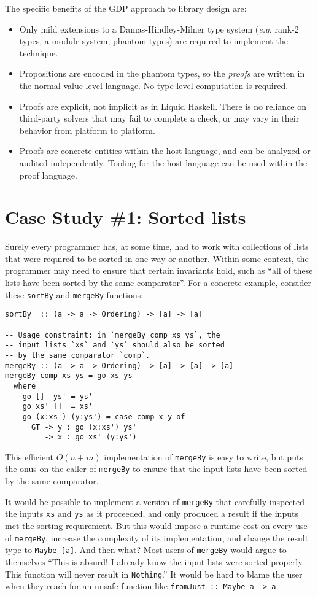 \documentclass[format=sigplan, review=false, screen=true]{acmart}
\begin{document}
The specific benefits of the GDP approach to library design are:
\begin{itemize}
\item Only mild extensions to a Damas-Hindley-Milner type system
  ({\it e.g.} rank-2 types, a module system, phantom types) are required to
  implement the technique.
\item Propositions are encoded in the phantom types, so the
  \emph{proofs} are written in the normal value-level language.
  No type-level computation is required.
\item Proofs are explicit, not implicit as in Liquid Haskell. There is
  no reliance on third-party solvers that may fail to complete a check,
  or may vary in their behavior from platform to platform.
\item Proofs are concrete entities within the host language, and can
  be analyzed or audited independently. Tooling for the host language
  can be used within the proof language.
\end{itemize}

\section{Case Study \#1: Sorted lists}

Surely every programmer has, at some time, had to work with collections of
lists that were required to be sorted in one way or another. Within some
context, the programmer may need to ensure that certain invariants hold, such
as ``all of these lists have been sorted by the same comparator''. For a concrete
example, consider these \texttt{sortBy} and \texttt{mergeBy} functions:
\begin{verbatim}
sortBy  :: (a -> a -> Ordering) -> [a] -> [a]

-- Usage constraint: in `mergeBy comp xs ys`, the
-- input lists `xs` and `ys` should also be sorted
-- by the same comparator `comp`.
mergeBy :: (a -> a -> Ordering) -> [a] -> [a] -> [a]
mergeBy comp xs ys = go xs ys
  where
    go []  ys' = ys'
    go xs' []  = xs'
    go (x:xs') (y:ys') = case comp x y of
      GT -> y : go (x:xs') ys'
      _  -> x : go xs' (y:ys')
\end{verbatim}
This efficient $O(n+m)$ implementation of \texttt{mergeBy} is easy to write,
but puts the onus on the caller of \texttt{mergeBy} to ensure that the
input lists have been sorted by the same comparator.

It would be possible to implement a version of \texttt{mergeBy} that
carefully inspected the inputs \texttt{xs} and \texttt{ys} as it
proceeded, and only produced a result if the inputs met the sorting
requirement. But this would impose a runtime cost on every use of
\texttt{mergeBy}, increase the complexity of its implementation,
and change the result type to \texttt{Maybe [a]}. And then what?
Most users of \texttt{mergeBy} would argue to themselves ``This is
absurd! I already know the input lists were sorted properly. This
function will never result in \texttt{Nothing}.'' It would be hard
to blame the user when they reach for an  unsafe function like
\texttt{fromJust :: Maybe a -> a}.
\end{document}
